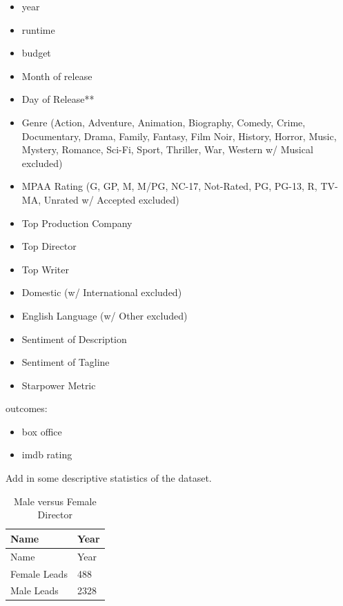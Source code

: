\documentclass[
]{agujournal2019}
\providecommand{\tightlist}{%
  \setlength{\itemsep}{0pt}\setlength{\parskip}{0pt}}\usepackage{longtable,booktabs,array}
\begin{document}
\begin{itemize}
\tightlist
\item
  year\\
\item
  runtime\\
\item
  budget\\
\item
  Month of release\\
\item
  Day of Release**\\
\item
  Genre (Action, Adventure, Animation, Biography, Comedy, Crime,
  Documentary, Drama, Family, Fantasy, Film Noir, History, Horror,
  Music, Mystery, Romance, Sci-Fi, Sport, Thriller, War, Western w/
  Musical excluded)\\
\item
  MPAA Rating (G, GP, M, M/PG, NC-17, Not-Rated, PG, PG-13, R, TV-MA,
  Unrated w/ Accepted excluded)\\
\item
  Top Production Company\\
\item
  Top Director\\
\item
  Top Writer\\
\item
  Domestic (w/ International excluded)\\
\item
  English Language (w/ Other excluded)\\
\item
  Sentiment of Description\\
\item
  Sentiment of Tagline\\
\item
  Starpower Metric
\end{itemize}

outcomes:

\begin{itemize}
\tightlist
\item
  box office\\
\item
  imdb rating
\end{itemize}

Add in some descriptive statistics of the dataset.

\begin{longtable}[]{@{}ll@{}}
\caption{Male versus Female Director}\label{tbl-history}\tabularnewline
\toprule\noalign{}
Name & Year \\
\midrule\noalign{}
\endfirsthead
\toprule\noalign{}
Name & Year \\
\midrule\noalign{}
\endhead
\bottomrule\noalign{}
\endlastfoot
Female Leads & 488 \\
Male Leads & 2328 \\
\end{longtable}
\end{document}
